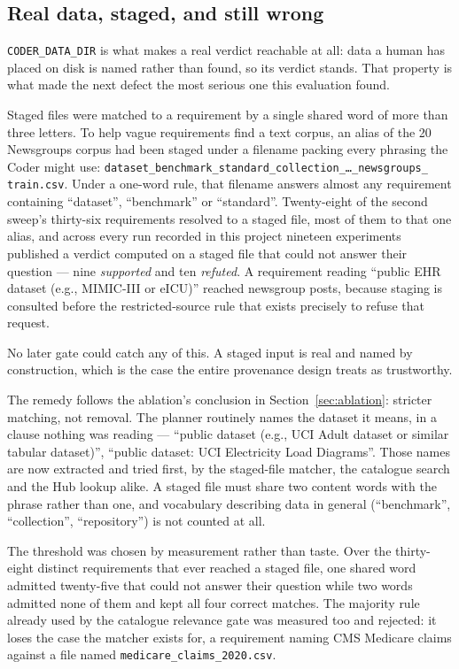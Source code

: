 \subsection{Real data, staged, and still wrong}
\label{sec:staged-hijack}

\texttt{CODER\_DATA\_DIR} is what makes a real verdict reachable at all: data a
human has placed on disk is named rather than found, so its verdict stands. That
property is what made the next defect the most serious one this evaluation found.

Staged files were matched to a requirement by a single shared word of more than
three letters. To help vague requirements find a text corpus, an alias of the 20
Newsgroups corpus had been staged under a filename packing every phrasing the Coder
might use: \texttt{dataset\_benchmark\_standard\_collection\_\ldots\_newsgroups\_%
train.csv}. Under a one-word rule, that filename answers almost any requirement
containing ``dataset'', ``benchmark'' or ``standard''. Twenty-eight of the second
sweep's thirty-six requirements resolved to a staged file, most of them to that one
alias, and across every run recorded in this project nineteen experiments published
a verdict computed on a staged file that could not answer their question --- nine
\emph{supported} and ten \emph{refuted}. A requirement reading ``public EHR dataset
(e.g., MIMIC-III or eICU)'' reached newsgroup posts, because staging is consulted
before the restricted-source rule that exists precisely to refuse that request.

No later gate could catch any of this. A staged input is real and named by
construction, which is the case the entire provenance design treats as trustworthy.

The remedy follows the ablation's conclusion in Section~\ref{sec:ablation}: stricter
matching, not removal. The planner routinely names the dataset it means, in a clause
nothing was reading --- ``public dataset (e.g., UCI Adult dataset or similar tabular
dataset)'', ``public dataset: UCI Electricity Load Diagrams''. Those names are now
extracted and tried first, by the staged-file matcher, the catalogue search and the
Hub lookup alike. A staged file must share two content words with the phrase rather
than one, and vocabulary describing data in general (``benchmark'', ``collection'',
``repository'') is not counted at all.

The threshold was chosen by measurement rather than taste. Over the thirty-eight
distinct requirements that ever reached a staged file, one shared word admitted
twenty-five that could not answer their question while two words admitted none of
them and kept all four correct matches. The majority rule already used by the
catalogue relevance gate was measured too and rejected: it loses the case the
matcher exists for, a requirement naming CMS Medicare claims against a file named
\texttt{medicare\_claims\_2020.csv}.


